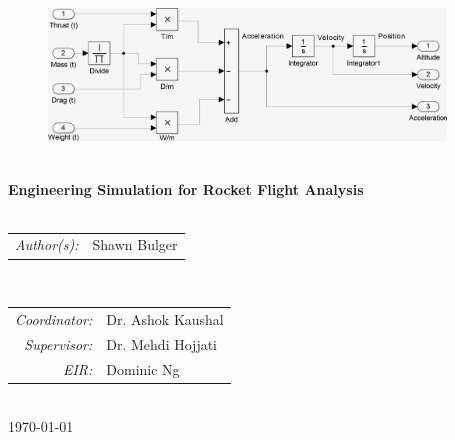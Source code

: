 \documentclass[]{book}
\begin{document}
\begin{titlepage}
\begin{figure}[ht]
    \centering
    \includegraphics[height=100pt]{../images/vertical_model_simplified.png}\\
\end{figure}


\HRule \\[0.6cm]
{ \Huge \bfseries 
Engineering Simulation for Rocket Flight Analysis
}\\[0.4cm] 

\HRule \\[1cm]
 

\begin{minipage}{0.4\textwidth}
\begin{flushleft} \large
	\begin{tabular} {r l} 
        \emph{Author(s):} & Shawn Bulger	\\
	\end{tabular}
\end{flushleft}
\end{minipage}
~
\begin{minipage}{0.4\textwidth}
\begin{flushright} \large
	\begin{tabular} {r l} 
		\emph{Coordinator:} & Dr. Ashok Kaushal 		\\
		\emph{Supervisor:}  & Dr. Mehdi Hojjati 		\\
		\emph{EIR:}         & Dominic Ng  		        \\
	\end{tabular}
\end{flushright}
\end{minipage}\\[2cm]


{\large \today}\\[2cm] %

\vfill %

\end{titlepage}
\end{document}
